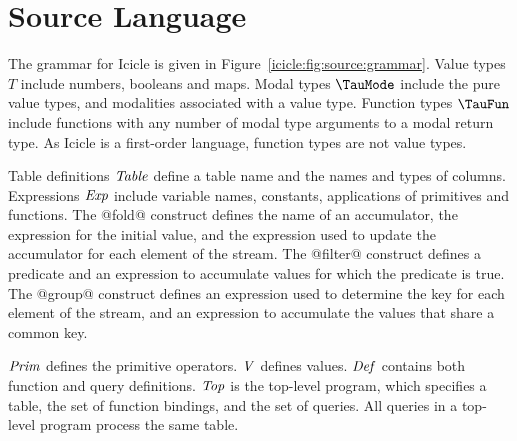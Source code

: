 \section{Source Language}
\label{icicle:s:IcicleSource}





The grammar for Icicle is given in Figure~\ref{icicle:fig:source:grammar}.
Value types $T$ include numbers, booleans and maps.
Modal types $\TauMode$ include the pure value types, and modalities associated with a value type.
Function types $\TauFun$ include functions with any number of modal type arguments to a modal return type.
As Icicle is a first-order language, function types are not value types.

Table definitions $\mathit{Table}$ define a table name and the names and types of columns.
Expressions $\mathit{Exp}$ include variable names, constants, applications of primitives and functions.
The @fold@ construct defines the name of an accumulator, the expression for the initial value, and the expression used to update the accumulator for each element of the stream.
The @filter@ construct defines a predicate and an expression to accumulate values for which the predicate is true.
The @group@ construct defines an expression used to determine the key for each element of the stream, and an expression to accumulate the values that share a common key.

$\mathit{Prim}$ defines the primitive operators.
$\mathit{V}$ defines values.
$\mathit{Def}$ contains both function and query definitions.
$\mathit{Top}$ is the top-level program, which specifies a table, the set of function bindings, and the set of queries.
All queries in a top-level program process the same table.


